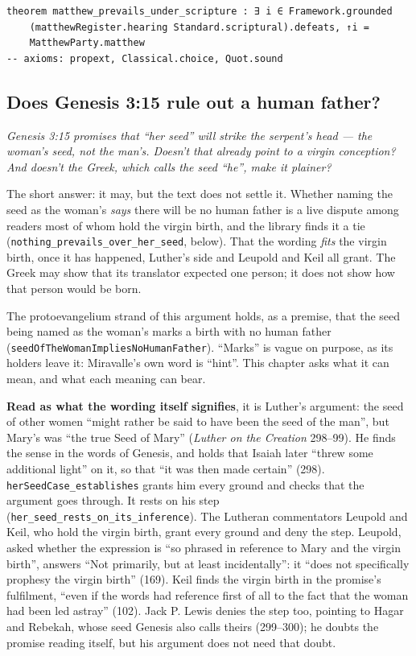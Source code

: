 \documentclass[11pt]{article}
\begin{document}
{\small\begin{verbatim}
theorem matthew_prevails_under_scripture : ∃ i ∈ Framework.grounded
    (matthewRegister.hearing Standard.scriptural).defeats, ↑i =
    MatthewParty.matthew
-- axioms: propext, Classical.choice, Quot.sound
\end{verbatim}}
\subsection*{Does Genesis 3:15 rule out a human father?}
\emph{Genesis 3:15 promises that “her seed” will strike the serpent’s head — the woman’s seed, not the man’s. Doesn’t that already point to a virgin conception? And doesn’t the Greek, which calls the seed “he”, make it plainer?}

The short answer: it may, but the text does not settle it. Whether naming the seed as the woman’s \emph{says} there will be no human father is a live dispute among readers most of whom hold the virgin birth, and the library finds it a tie (\texttt{nothing\_\allowbreak{}prevails\_\allowbreak{}over\_\allowbreak{}her\_\allowbreak{}seed}, below). That the wording \emph{fits} the virgin birth, once it has happened, Luther’s side and Leupold and Keil all grant. The Greek may show that its translator expected one person; it does not show how that person would be born.

The protoevangelium strand of this argument holds, as a premise, that the seed being named as the woman’s marks a birth with no human father (\texttt{seed\allowbreak{}Of\allowbreak{}The\allowbreak{}Woman\allowbreak{}Implies\allowbreak{}No\allowbreak{}Human\allowbreak{}Father}). “Marks” is vague on purpose, as its holders leave it: Miravalle’s own word is “hint”. This chapter asks what it can mean, and what each meaning can bear.

\textbf{Read as what the wording itself signifies}, it is Luther’s argument: the seed of other women “might rather be said to have been the seed of the man”, but Mary’s was “the true Seed of Mary” (\emph{Luther on the Creation} 298–99). He finds the sense in the words of Genesis, and holds that Isaiah later “threw some additional light” on it, so that “it was then made certain” (298). \texttt{her\allowbreak{}Seed\allowbreak{}Case\_\allowbreak{}establishes} grants him every ground and checks that the argument goes through. It rests on his step (\texttt{her\_\allowbreak{}seed\_\allowbreak{}rests\_\allowbreak{}on\_\allowbreak{}its\_\allowbreak{}inference}). The Lutheran commentators Leupold and Keil, who hold the virgin birth, grant every ground and deny the step. Leupold, asked whether the expression is “so phrased in reference to Mary and the virgin birth”, answers “Not primarily, but at least incidentally”: it “does not specifically prophesy the virgin birth” (169). Keil finds the virgin birth in the promise’s fulfilment, “even if the words had reference first of all to the fact that the woman had been led astray” (102). Jack P. Lewis denies the step too, pointing to Hagar and Rebekah, whose seed Genesis also calls theirs (299–300); he doubts the promise reading itself, but his argument does not need that doubt.
\end{document}
